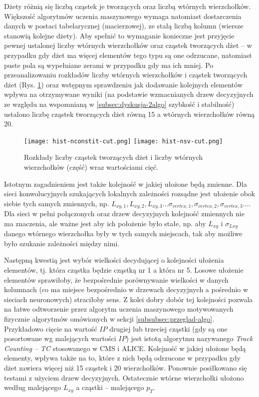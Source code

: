 Dżety różnią się liczbą cząstek je tworzących oraz liczbą wtórnych wierzchołków. Większość algorytmów uczenia maszynowego wymaga natomiast dostarczenia danych w postaci tabelarycznej (macierzowej), ze stałą liczbą kolumn (wiersze stanowią kolejne dżety). Aby spełnić to wymaganie konieczne jest przyjęcie pewnej ustalonej liczby wtórnych wierzchołków oraz cząstek tworzących dżet -- w przypadku gdy dżet ma więcej elementów tego typu są one odrzucane, natomiast puste pola są wypełniane zerami w przypadku gdy ma ich mniej. 
Po przeanalizowaniu rozkładów liczby wtórnych wierzchołków i cząstek tworzących dżet (Rys. \ref{fig:nsv_nconstit_distr}) oraz wstępnym sprawdzeniu jak dodawanie kolejnych elementów wpływa na otrzymywane wyniki (na podstawie wzmacnianych drzew decyzyjnych ze względu na wspomnianą w \ref{subsec:dyskusja-2algo} szybkość i stabilność) ustalono liczbę cząstek tworzących dżet równą 15 a wtórnych wierzchołków równą 20.

\begin{figure}[ht]
	\centering
	\texttt{[image: hist-nconstit-cut.png]}
	\texttt{[image: hist-nsv-cut.png]}
	\caption{Rozkłady liczby cząstek tworzących dżet i liczby wtórnych wierzchołków (część) wraz wartościami cięć.}
	\label{fig:nsv_nconstit_distr}
\end{figure}

Istotnym zagadnieniem jest także kolejność w jakiej ułożone będą zmienne. 
Dla sieci konwolucyjnych szukających lokalnych zależności rozsądne jest ułożenie obok siebie tych samych zmiennych, np. $L_{xy,1}, L_{xy,2}, L_{xy,3} \dots \sigma_{vertex,1}, \sigma_{vertex,2}, \sigma_{vertex,3} \dots$. 
Dla sieci w pełni połączonych oraz drzew decyzyjnych kolejność zmiennych nie ma znaczenia, ale ważne jest aby ich położenie było stałe, np. aby $L_{xy}$ i $\sigma_{Lxy}$ danego wtórnego wierzchołka były w tych samych miejscach, tak aby możliwe było szukanie zależności między nimi.

Następną kwestią jest wybór wielkości decydującej o kolejności ułożenia elementów, tj. która cząstka będzie cząstką nr 1 a która nr 5. Losowe ułożenie elementów sprawiłoby, że bezpośrednie porównywanie wielkości w danych kolumnach (co ma miejsce bezpośrednio w drzewach decyzyjnych a pośrednio w sieciach neuronowych) straciłoby sens. Z kolei dobry dobór tej kolejności pozwala na łatwe odtworzenie przez algorytm uczenia maszynowego motywowanych fizycznie algorytmów omówionych w sekcji \ref{subsubsec:przeglad-algo}. Przykładowo cięcie na wartość $IP$ drugiej lub trzeciej cząstki (gdy są one posortowane wg malejących wartości $IP$) jest istotą algorytmu nazywanego \textit{Track Counting -- TC} stosowanego w CMS i ALICE.
Kolejność w jakiej ułożone będą elementy, wpływa także na to, które z nich będą odrzucone w przypadku gdy dżet zawiera więcej niż 15 cząstek i 20 wierzchołków. 
Ponownie posiłkowano się testami z użyciem drzew decyzyjnych. Ostatecznie wtórne wierzchołki ułożono według malejącego $L_{xy}$ a cząstki -- malejącego $p_T$.

